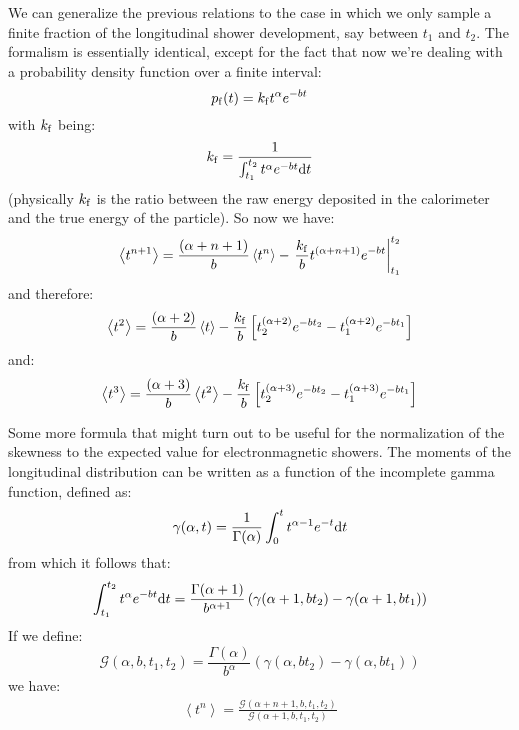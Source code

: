 \documentclass[a4paper,11pt]{article}
\begin{document}
We can generalize the previous relations to the case in which we only
sample a finite fraction of the longitudinal shower development,
say between $t_1$ and $t_2$. The formalism is essentially identical, except
for the fact that now we're dealing with a probability density function
over a finite interval:
$$
p_{\rm f}(t) = k_{\rm f} t^\alpha e^{-bt}
$$
with $k_{\rm f}$ being:
$$
k_{\rm f} = \frac{1}{\int_{t_1}^{t_2} t^\alpha e^{-bt} {\rm d}t}
$$
(physically $k_{\rm f}$ is the ratio between the raw energy deposited in the
calorimeter and the true energy of the particle). So now we have:
\begin{equation}
\left< t^{n+1} \right> = \frac{(\alpha + n + 1)}{b}\left< t^n \right> -
\left.\frac{k_{\rm f}}{b} t^{(\alpha + n + 1)} e^{-bt}\right|_{t_1}^{t_2}
\end{equation}
and therefore:
\begin{equation}
\left< t^2 \right> = \frac{(\alpha + 2)}{b}\left< t \right> -
\frac{k_{\rm f}}{b}
\left[t_2^{(\alpha + 2)} e^{-bt_2} - t_1^{(\alpha + 2)} e^{-bt_1}\right]
\end{equation}
and:
\begin{equation}
\left< t^3 \right> = \frac{(\alpha + 3)}{b}\left< t^2 \right> -
\frac{k_{\rm f}}{b}
\left[t_2^{(\alpha + 3)} e^{-bt_2} - t_1^{(\alpha + 3)} e^{-bt_1}\right]
\end{equation}

Some more formula that might turn out to be useful for the normalization
of the skewness to the expected value for electronmagnetic showers.
The moments of the longitudinal distribution can be written as a function
of the incomplete gamma function, defined as:
\begin{equation}
\gamma(\alpha, t) = \frac{1}{\Gamma(\alpha)}
\int_{0}^{t} t^{\alpha - 1} e^{-t} {\rm d}t
\end{equation}
from which it follows that:
\begin{equation}
\int_{t_1}^{t_2} t^{\alpha} e^{-bt} {\rm d}t =
\frac{\Gamma(\alpha+1)}{b^{\alpha+1}}
\left( \gamma(\alpha+1, bt_2) - \gamma(\alpha+1, bt_1) \right)
\end{equation}
If we define:
$$
{\mathcal G}(\alpha, b, t_1, t_2) = \frac{\Gamma(\alpha)}{b^{\alpha}}
\left( \gamma(\alpha, bt_2) - \gamma(\alpha, bt_1) \right)
$$
we have:
\begin{align}
\left< t^n \right> =
\frac{{\mathcal G}(\alpha + n + 1, b, t_1, t_2)}
     {{\mathcal G}(\alpha + 1, b, t_1, t_2)}
\end{align}
\end{document}
